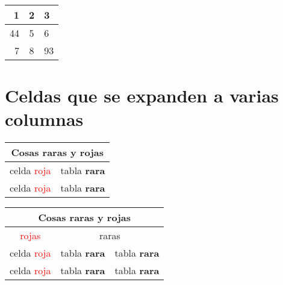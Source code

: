 \documentclass[11pt, a4paper]{article}
\begin{document}
\bigskip
%
\begin{tabular}{|r@{}c@{}l|}
\hline
1 & 2 & 3 \\ 
\hline\hline
44 & 5 & 6 \\ 
7 & 8 & 93 \\
\hline
\end{tabular}


















\section{Celdas que se expanden a varias columnas}

%
% 
%







\bigskip
%
\begin{tabular}{|l|l|}
\hline
\multicolumn{2}{|c|}{Cosas raras y rojas} \\
\hline\hline
celda \textcolor{red}{roja} & tabla \textbf{rara}\\
celda \textcolor{red}{roja} & tabla \textbf{rara}\\
\hline
\end{tabular}







\bigskip
%
\begin{tabular}{|c|c|c|}
\hline
\multicolumn{3}{|c|}{Cosas raras y rojas}          \\
\hline\hline
\textcolor{red}{rojas} & \multicolumn{2}{c|}{raras}       \\
\hline\hline
celda \textcolor{red}{roja} & tabla \textbf{rara} & tabla \textbf{rara}\\
\cline{2-3}
celda \textcolor{red}{roja} & tabla \textbf{rara} & tabla \textbf{rara}\\
\hline
\end{tabular}
\end{document}
